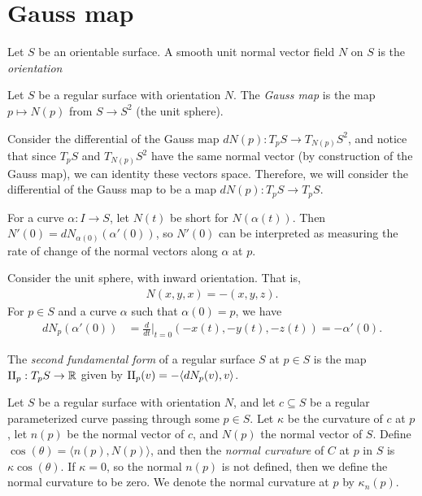 \section{Gauss map}

\begin{defn}
    Let $S$ be an orientable surface. A smooth unit normal vector field $N$ on $S$ is the \emph{orientation}
\end{defn}

\begin{defn}
    Let $S$ be a regular surface with orientation $N$. The \emph{Gauss map} is the map $p \mapsto N(p)$ from $S \to S^2$ (the unit sphere).
\end{defn}

\begin{rmk}
    Consider the differential of the Gauss map $dN(p): T_pS \to T_{N(p)}S^2$, and notice that since $T_pS$ and $T_{N(p)}S^2$ have the same normal vector (by construction of the Gauss map), we can identity these vectors space. Therefore, we will consider the differential of the Gauss map to be a map $dN(p): T_pS \to T_pS$.
\end{rmk}

\begin{rmk}
    For a curve $\alpha: I \to S$, let $N(t)$ be short for $N(\alpha(t))$. Then $N'(0) = dN_{\alpha(0)}(\alpha'(0))$, so $N'(0)$ can be interpreted as measuring the rate of change of the normal vectors along $\alpha$ at $p$. 
\end{rmk}

\begin{exmp}
    Consider the unit sphere, with inward orientation. That is,
    \begin{align*}
        N(x,y,x) = -(x,y,z).
    \end{align*}
    For $p \in S$ and a curve $\alpha$ such that $\alpha(0) = p$, we have
    \begin{align*}
        dN_p(\alpha'(0)) &= \frac{d}{dt}|_{t=0}(-x(t), -y(t), -z(t)) = -\alpha'(0).
    \end{align*}
\end{exmp}

\begin{defn}
    The \emph{second fundamental form} of a regular surface $S$ at $p \in S$ is the map $\operatorname{II}_p: T_pS \to \mathbb{R}$ given by $\operatorname{II}_p(v) = -\langle dN_p(v), v\rangle$.
\end{defn}

\begin{defn}
    Let $S$ be a regular surface with orientation $N$, and let $c \subseteq S$ be a regular parameterized curve passing through some $p \in S$. Let $\kappa$ be the curvature of $c$ at $p$, let $n(p)$ be the normal vector of $c$, and $N(p)$ the normal vector of $S$. Define $\cos(\theta) = \langle n(p), N(p) \rangle$, and then the \emph{normal curvature} of $C$ at $p$ in $S$ is $\kappa\cos(\theta)$. If $\kappa = 0$, so the normal $n(p)$ is not defined, then we define the normal curvature to be zero. We denote the normal curvature at $p$ by $\kappa_n(p)$.
\end{defn}

